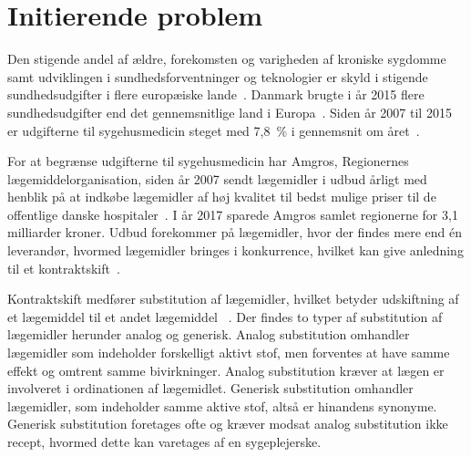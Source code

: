 \chapter{Initierende problem}
Den stigende andel af ældre, forekomsten og varigheden af kroniske sygdomme samt udviklingen i sundhedsforventninger og teknologier er skyld i stigende sundhedsudgifter i flere europæiske lande~\citep{Ess2003}. Danmark brugte i år 2015 flere sundhedsudgifter end det gennemsnitlige land i Europa~\citep{EU2017}. Siden år 2007 til 2015 er udgifterne til sygehusmedicin steget med 7,8~\% i gennemsnit om året~\citep{Sundhed2016}.

For at begrænse udgifterne til sygehusmedicin har Amgros, Regionernes lægemiddelorganisation, siden år 2007 sendt lægemidler i udbud årligt med henblik på at indkøbe lægemidler af høj kvalitet til bedst mulige priser til de offentlige danske hospitaler~\citep{Sygehusapoteket2017}. I år 2017 sparede Amgros samlet regionerne for 3,1 milliarder kroner. Udbud forekommer på lægemidler, hvor der findes mere end én leverandør, hvormed lægemidler bringes i konkurrence, hvilket kan give anledning til et kontraktskift~\citep{Amgros2015}.

Kontraktskift medfører substitution af lægemidler, hvilket betyder udskiftning af et lægemiddel til et andet lægemiddel ~\citep{DanskSelskabforPatientsikkerhed2009}. %
Der findes to typer af substitution af lægemidler herunder analog og generisk. Analog substitution omhandler lægemidler som indeholder forskelligt aktivt stof, men forventes at have samme effekt og omtrent samme bivirkninger. Analog substitution kræver at lægen er involveret i ordinationen af lægemidlet.
Generisk substitution omhandler lægemidler, som indeholder samme aktive stof, altså er hinandens synonyme. Generisk substitution foretages ofte og kræver modsat analog substitution ikke recept, hvormed dette kan varetages af en sygeplejerske.~\citep{DanskSelskabforPatientsikkerhed2009} 





